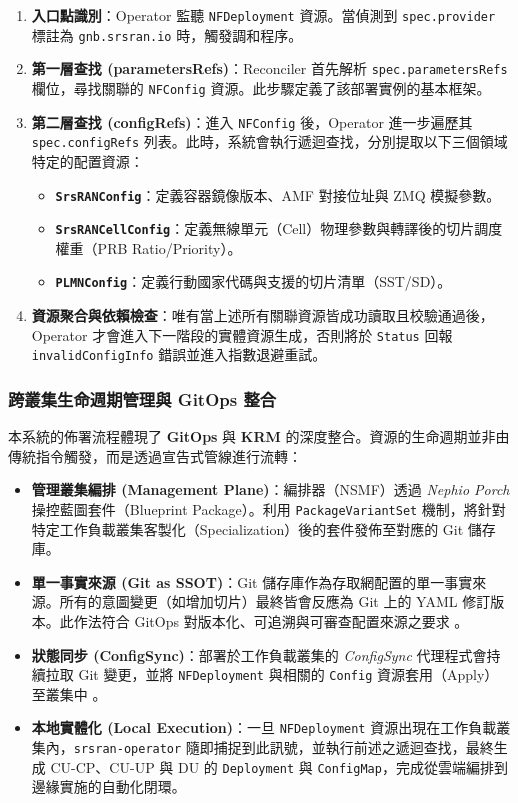 \begin{enumerate}
    \item \textbf{入口點識別}：Operator 監聽 \texttt{NFDeployment} 資源。當偵測到 \texttt{spec.provider} 標註為 \texttt{gnb.srsran.io} 時，觸發調和程序。
    \item \textbf{第一層查找 (parametersRefs)}：Reconciler 首先解析 \texttt{spec.parametersRefs} 欄位，尋找關聯的 \texttt{NFConfig} 資源。此步驟定義了該部署實例的基本框架。
    \item \textbf{第二層查找 (configRefs)}：進入 \texttt{NFConfig} 後，Operator 進一步遍歷其 \texttt{spec.configRefs} 列表。此時，系統會執行遞迴查找，分別提取以下三個領域特定的配置資源：
    \begin{itemize}
        \item \textbf{\texttt{SrsRANConfig}}：定義容器鏡像版本、AMF 對接位址與 ZMQ 模擬參數。
        \item \textbf{\texttt{SrsRANCellConfig}}：定義無線單元（Cell）物理參數與轉譯後的切片調度權重（PRB Ratio/Priority）。
        \item \textbf{\texttt{PLMNConfig}}：定義行動國家代碼與支援的切片清單（SST/SD）。
    \end{itemize}
    \item \textbf{資源聚合與依賴檢查}：唯有當上述所有關聯資源皆成功讀取且校驗通過後，Operator 才會進入下一階段的實體資源生成，否則將於 \texttt{Status} 回報 \texttt{invalidConfigInfo} 錯誤並進入指數退避重試。
\end{enumerate}

\subsubsection{跨叢集生命週期管理與 GitOps 整合}
本系統的佈署流程體現了 \textbf{GitOps} 與 \textbf{KRM} 的深度整合。資源的生命週期並非由傳統指令觸發，而是透過宣告式管線進行流轉：

\begin{itemize}
    \item \textbf{管理叢集編排 (Management Plane)}：編排器（NSMF）透過 \textit{Nephio Porch} 操控藍圖套件（Blueprint Package）。利用 \texttt{PackageVariantSet} 機制，將針對特定工作負載叢集客製化（Specialization）後的套件發佈至對應的 Git 儲存庫。
    \item \textbf{單一事實來源 (Git as SSOT)}：Git 儲存庫作為存取網配置的單一事實來源。所有的意圖變更（如增加切片）最終皆會反應為 Git 上的 YAML 修訂版本。此作法符合 GitOps 對版本化、可追溯與可審查配置來源之要求 \cite{cncf_gitops_2025}。
    \item \textbf{狀態同步 (ConfigSync)}：部署於工作負載叢集的 \textit{ConfigSync} 代理程式會持續拉取 Git 變更，並將 \texttt{NFDeployment} 與相關的 \texttt{Config} 資源套用（Apply）至叢集中 \cite{google_config_sync}。
    \item \textbf{本地實體化 (Local Execution)}：一旦 \texttt{NFDeployment} 資源出現在工作負載叢集內，\texttt{srsran-operator} 隨即捕捉到此訊號，並執行前述之遞迴查找，最終生成 CU-CP、CU-UP 與 DU 的 \texttt{Deployment} 與 \texttt{ConfigMap}，完成從雲端編排到邊緣實施的自動化閉環。
\end{itemize}

